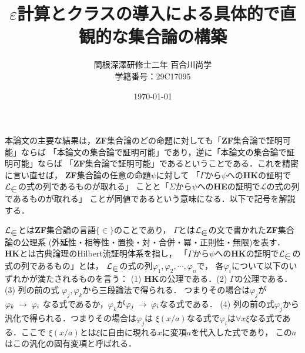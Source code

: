 \documentclass[twocolumn,10pt]{jarticle}
\title{$\varepsilon$計算とクラスの導入による具体的で直観的な集合論の構築}
\author{関根深澤研修士二年 百合川尚学 \\ 学籍番号：29C17095}
\date{\today}
\theoremstyle{mystyle}
\newcommand{\lang}[1]{\mathcal{L}_{\scalebox{1.2}{$#1$}}} %
\newcommand{\rarrow}{\hspace{0.25em}\rightarrow\hspace{0.25em}} %
\begin{document}
\maketitle
	本論文の主要な結果は，{\bf ZF}集合論のどの命題に対しても「{\bf ZF}集合論で証明可能」ならば
	「本論文の集合論で証明可能」であり，逆に「本論文の集合論で証明可能」ならば
	「{\bf ZF}集合論で証明可能」であるということである．これを精密に言い直せば，
	{\bf ZF}集合論の任意の命題$\psi$に対して
	「$\Gamma$から$\psi$への{\bf HK}の証明で$\lang{\in}$の式の列であるものが取れる」
	ことと「$\Sigma$から$\psi$への{\bf HE}の証明で$\mathcal{L}$の式の列であるものが取れる」
	ことが同値であるという意味になる．以下で記号を解説する．
	
	$\lang{\in}$とは{\bf ZF}集合論の言語$\{\in\}$のことであり，
	$\Gamma$とは$\lang{\in}$の文で書かれた{\bf ZF}集合論の公理系
	(外延性・相等性・置換・対・合併・冪・正則性・無限)を表す．
	{\bf HK}とは古典論理のHilbert流証明体系を指し，
	「$\Gamma$から$\psi$への{\bf HK}の証明で$\lang{\in}$の式の列であるもの」とは，
	$\lang{\in}$の式の列$\varphi_{1},\varphi_{2},\cdots,\varphi_{n}$で，
	各$\varphi_{i}$について以下のいずれかが満たされるものを言う：
	(1) {\bf HK}の公理である．(2) $\Gamma$の公理である．(3) 列の前の式
	$\varphi_{j},\varphi_{k}$から三段論法で得られる．
	つまりその場合は$\varphi_{j}$が$\varphi_{k} \rarrow \varphi_{i}$
	なる式であるか，$\varphi_{k}$が$\varphi_{j} \rarrow \varphi_{i}$なる式である．
	(4) 列の前の式$\varphi_{j}$から汎化で得られる．つまりその場合は$\varphi_{j}$は
	$\xi(x/a)$なる式で$\varphi_{i}$は$\forall x \xi$なる式である．ここで
	$\xi(x/a)$とは$\xi$に自由に現れる$x$に変項$a$を代入した式であり，
	この$a$はこの汎化の固有変項と呼ばれる．
	
\end{document}
